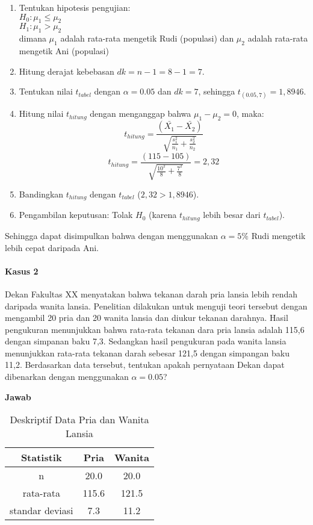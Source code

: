 \documentclass[
]{book}
\providecommand{\tightlist}{%
  \setlength{\itemsep}{0pt}\setlength{\parskip}{0pt}}
\begin{document}
\begin{enumerate}
\def\labelenumi{\arabic{enumi}.}
\tightlist
\item
  Tentukan hipotesis pengujian:\\
  \(H_0 : \mu_1 \leq \mu_2\)\\
  \(H_1 : \mu_1 > \mu_2\)\\
  dimana \(\mu_1\) adalah rata-rata mengetik Rudi (populasi) dan \(\mu_2\) adalah rata-rata mengetik Ani (populasi)
\item
  Hitung derajat kebebasan \(dk = n - 1 = 8 - 1 = 7\).
\item
  Tentukan nilai \(t_{tabel}\) dengan \(\alpha=0.05\) dan \(dk = 7\), sehingga \(t_{(0.05,7)} = 1,8946\).
\item
  Hitung nilai \(t_{hitung}\) dengan menganggap bahwa \(\mu_1-\mu_2 = 0\), maka:\\
  \[
  t_{hitung} = \frac{(\bar{X_1}-\bar{X_2})}{\sqrt{\frac{s_1^2}{n_1}+\frac{s_2^2}{n_2}}}
  \]
  \[
  t_{hitung} = \frac{(115-105)}{\sqrt{\frac{10^2}{8}+\frac{7^2}{8}}} = 2,32
  \]
\item
  Bandingkan \(t_{hitung}\) dengan \(t_{tabel}\) (\(2,32 > 1,8946\)).
\item
  Pengambilan keputusan: Tolak \(H_0\) (karena \(t_{hitung}\) lebih besar dari \(t_{tabel}\)).
\end{enumerate}

Sehingga dapat disimpulkan bahwa dengan menggunakan \(\alpha = 5\%\) Rudi mengetik lebih cepat daripada Ani.

\hypertarget{kasus-2}{%
\paragraph{Kasus 2}\label{kasus-2}}

Dekan Fakultas XX menyatakan bahwa tekanan darah pria lansia lebih rendah daripada wanita lansia. Penelitian dilakukan untuk menguji teori tersebut dengan mengambil 20 pria dan 20 wanita lansia dan diukur tekanan darahnya. Hasil pengukuran menunjukkan bahwa rata-rata tekanan dara pria lansia adalah 115,6 dengan simpanan baku 7,3. Sedangkan hasil pengukuran pada wanita lansia menunjukkan rata-rata tekanan darah sebesar 121,5 dengan simpangan baku 11,2. Berdasarkan data tersebut, tentukan apakah pernyataan Dekan dapat dibenarkan dengan menggunakan \(\alpha=0.05\)?

\textbf{Jawab}\\

\begin{table}

\caption{\label{tab:unnamed-chunk-8}Deskriptif Data Pria dan Wanita Lansia}
\centering
\begin{tabular}[t]{ccc}
\toprule
Statistik & Pria & Wanita\\
\midrule
n & 20.0 & 20.0\\
rata-rata & 115.6 & 121.5\\
standar deviasi & 7.3 & 11.2\\
\bottomrule
\end{tabular}
\end{table}
\end{document}
